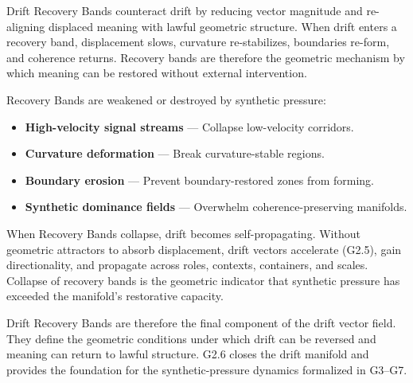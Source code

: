 \medskip

\noindent Drift Recovery Bands counteract drift by reducing vector magnitude and
re-aligning displaced meaning with lawful geometric structure. When drift enters
a recovery band, displacement slows, curvature re-stabilizes, boundaries
re-form, and coherence returns. Recovery bands are therefore the geometric
mechanism by which meaning can be restored without external intervention.

\medskip

\noindent Recovery Bands are weakened or destroyed by synthetic pressure:

\begin{itemize}[leftmargin=1.2cm]
    \item \textbf{High-velocity signal streams} — Collapse low-velocity
    corridors.

    \item \textbf{Curvature deformation} — Break curvature-stable regions.

    \item \textbf{Boundary erosion} — Prevent boundary-restored zones from
    forming.

    \item \textbf{Synthetic dominance fields} — Overwhelm coherence-preserving
    manifolds.
\end{itemize}

\medskip

\noindent When Recovery Bands collapse, drift becomes self-propagating. Without
geometric attractors to absorb displacement, drift vectors accelerate (G2.5),
gain directionality, and propagate across roles, contexts, containers, and
scales. Collapse of recovery bands is the geometric indicator that synthetic
pressure has exceeded the manifold’s restorative capacity.

\medskip

\noindent Drift Recovery Bands are therefore the final component of the drift
vector field. They define the geometric conditions under which drift can be
reversed and meaning can return to lawful structure. G2.6 closes the drift
manifold and provides the foundation for the synthetic-pressure dynamics
formalized in G3--G7.
